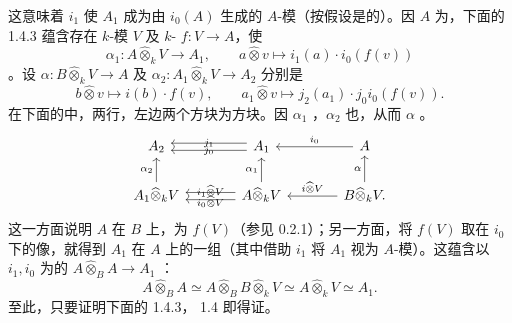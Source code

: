 这意味着 $i_1$ 使 $A_1$ 成为由 $i_0(A)$ 生成的 $A$-模（按假设是的）。因 $A$ 为，下面的 1.4.3 蕴含存在 $k$-模 $V$ 及 $k$- $f:V\to A$，使
\[
 \alpha_1:A\widehat\otimes_k V\longrightarrow A_1,\qquad a\widehat\otimes v\longmapsto i_1(a)\cdot i_0(f(v))
\]
。设 $\alpha:B\widehat\otimes_k V\to A$ 及 $\alpha_2:A_1\widehat\otimes_k V\to A_2$ 分别是
\[
 b\widehat\otimes v\longmapsto i(b)\cdot f(v),\qquad
 a_1\widehat\otimes v\longmapsto j_2(a_1)\cdot j_0i_0(f(v)).
\]
在下面的中，两行，左边两个方块为方块。因 $\alpha_1$ ，$\alpha_2$ 也，从而 $\alpha$ 。
\[
\begin{tikzcd}[column sep=large]
 A_2&A_1\arrow[l,shift left=.6ex,"j_1"']\arrow[l,shift right=.6ex,"j_0"]&A\arrow[l,"i_0"']\\
 A_1\widehat\otimes_k V\arrow[u,"\alpha_2"]
 &A\widehat\otimes_k V\arrow[l,shift left=.6ex,"{i_1\widehat\otimes V}"']\arrow[l,shift right=.6ex,"{i_0\widehat\otimes V}"]\arrow[u,"\alpha_1"]
 &B\widehat\otimes_k V\arrow[l,"{i\widehat\otimes V}"']\arrow[u,"\alpha"].
\end{tikzcd}
\]
这一方面说明 $A$ 在 $B$ 上，为 $f(V)$（参见 0.2.1）；另一方面，将 $f(V)$ 取在 $i_0$ 下的像，就得到 $A_1$ 在 $A$ 上的一组（其中借助 $i_1$ 将 $A_1$ 视为 $A$-模）。这蕴含以 $i_1,i_0$ 为的 $A\widehat\otimes_B A\to A_1$ ：
\[
 A\widehat\otimes_B A\simeq A\widehat\otimes_B B\widehat\otimes_k V
 \simeq A\widehat\otimes_k V\simeq A_1.
\]
至此，只要证明下面的 1.4.3， 1.4 即得证。

